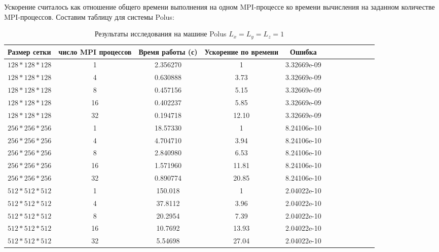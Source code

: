 \documentclass{article}
\begin{document}
    Ускорение считалось как отношение общего времени выполнения 
    на одном MPI-процессе ко времени вычисления на заданном количестве MPI-процессов.
    Составим таблицу для системы Polus:
    \begin{table*}[!t]
        \centering
        \caption{Результаты исследования на машине Polus \(L_x = L_y = L_z = 1\)}\label{tab:tab1}
        \begin{tabularx}{\textwidth}{@{}l*{10}{C}c@{}} %
            \toprule
            \bf Размер сетки & \bf число MPI процессов  & \bf Время работы (с) & \bf Ускорение по времени & \bf Ошибка \\
                \midrule
                \(128*128*128\) & 1  & 2.356270 & 1     & 3.32669e-09\\
                \(128*128*128\) & 4  & 0.630888 & 3.73  & 3.32669e-09\\
                \(128*128*128\) & 8  & 0.457156 & 5.15  & 3.32669e-09\\
                \(128*128*128\) & 16 & 0.402237 & 5.85  & 3.32669e-09\\
                \(128*128*128\) & 32 & 0.194718 & 12.10 & 3.32669e-09\\
                \midrule
                \(256*256*256\) & 1  & 18.57330 & 1     & 8.24106e-10 \\
                \(256*256*256\) & 4  & 4.704710 & 3.94  & 8.24106e-10 \\
                \(256*256*256\) & 8  & 2.840980 & 6.53  & 8.24106e-10 \\
                \(256*256*256\) & 16 & 1.571960 & 11.81 & 8.24106e-10 \\
                \(256*256*256\) & 32 & 0.890774 & 20.85 & 8.24106e-10 \\
                \midrule
                \(512*512*512\) & 1  & 150.018 & 1      & 2.04022e-10 \\
                \(512*512*512\) & 4  & 37.8112 & 3.96   & 2.04022e-10 \\
                \(512*512*512\) & 8  & 20.2954 & 7.39   & 2.04022e-10 \\
                \(512*512*512\) & 16 & 10.7692 & 13.93  & 2.04022e-10 \\
                \(512*512*512\) & 32 & 5.54698 & 27.04  & 2.04022e-10 \\
                \bottomrule
            \end{tabularx}
        \end{table*}
\end{document}
